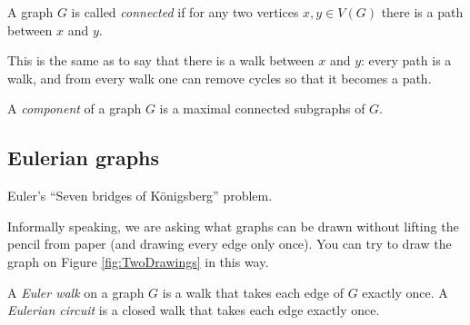 \begin{page}
\setcounter{section}{1}
\setcounter{subsection}{5}
\setcounter{dfn}{17}
\label{portion:229}

\begin{dfn}
A graph $G$ is called \emph{connected} if for any two vertices $x, y \in V(G)$ there is a path between $x$ and $y$.
\end{dfn}

\end{page}

\begin{page}
\setcounter{section}{1}
\setcounter{subsection}{5}
\setcounter{dfn}{17}
\label{portion:230}


This is the same as to say that there is a walk between $x$ and $y$:
every path is a walk, and from every walk one can remove cycles so that it becomes a path.


\end{page}

\begin{page}
\setcounter{section}{1}
\setcounter{subsection}{5}
\setcounter{dfn}{18}
\label{portion:232}

\begin{dfn}
A \emph{component} of a graph $G$ is a maximal connected subgraphs of $G$.
\end{dfn}

\end{page}

\begin{page}
\setcounter{section}{1}
\setcounter{subsection}{6}
\setcounter{dfn}{18}
\label{portion:235}

\subsection{Eulerian graphs}
Euler's ``Seven bridges of K\"onigsberg'' problem.

Informally speaking, we are asking what graphs can be drawn without lifting the pencil from paper
(and drawing every edge only once).
You can try to draw the graph on Figure \ref{fig:TwoDrawings} in this way.


\end{page}

\begin{page}
\setcounter{section}{1}
\setcounter{subsection}{6}
\setcounter{dfn}{19}
\label{portion:237}

\begin{dfn}
A \emph{Euler walk} on a graph $G$ is a walk that takes each edge of $G$ exactly once.
A \emph{Eulerian circuit} is a closed walk that takes each edge exactly once.
\end{dfn}

\end{page}

